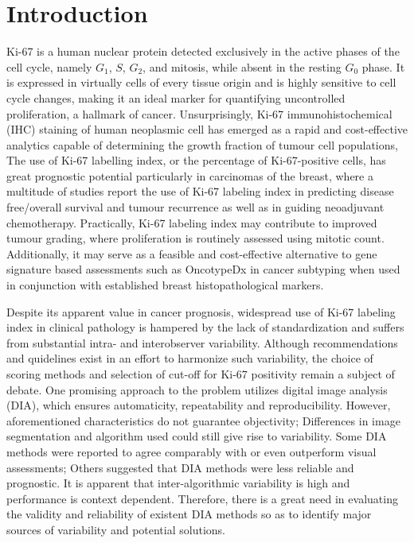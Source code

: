 \documentclass[final,5p,times,twocolumn]{elsarticle}
\begin{document}
\section*{Introduction}

Ki-67 is a human nuclear protein detected exclusively in the active phases of the cell cycle, namely $G_1$, $S$, $G_2$, and mitosis, while absent in the resting $G_0$ phase.\cite{Gerdes1984} It is expressed in virtually cells of every tissue origin and is highly sensitive to cell cycle changes, making it an ideal marker for quantifying uncontrolled proliferation, a hallmark of cancer. Unsurprisingly, Ki-67 immunohistochemical (IHC) staining of human neoplasmic cell has emerged as a rapid and cost-effective analytics capable of determining the growth fraction of tumour cell populations,  \cite{Scholzen2000} The use of Ki-67 labelling index, or the percentage of Ki-67-positive cells, has great prognostic potential particularly in carcinomas of the breast, where a multitude of studies report the use of Ki-67 labeling index in predicting disease free/overall survival and tumour recurrence \cite{Stuart-Harris2005, DeAzambuja2007, Petrelli2015} as well as in guiding neoadjuvant chemotherapy. \cite{Jones2009, Nishimura2010, Fasching2011} Practically, Ki-67 labeling index may contribute to improved tumour grading, where proliferation is routinely assessed using mitotic count. \cite{VanDiest2004} Additionally, it may serve as a feasible and cost-effective alternative to gene signature based assessments such as OncotypeDx in cancer subtyping when used in conjunction with established breast histopathological markers. \cite{Cuzick2011}

Despite its apparent value in cancer prognosis, widespread use of Ki-67 labeling index in clinical pathology is hampered by the lack of standardization and suffers from substantial intra- and interobserver variability. \cite{Dowsett2011a, Polley2013a} Although recommendations and quidelines exist in an effort to harmonize such variability, \cite{Polley2015} the choice of scoring methods and selection of cut-off for Ki-67 positivity remain a subject of debate. One promising approach to the problem utilizes digital image analysis (DIA), which ensures automaticity, repeatability and reproducibility. However, aforementioned characteristics do not guarantee objectivity; Differences in image segmentation and algorithm used could still give rise to variability. \cite{Tadrous2010} Some DIA methods were reported to agree comparably with \cite{Mohammed2012, Tang2012} or even outperform visual assessments; \cite{Laurinavicius2014, Stalhammar2016} Others suggested that DIA methods were less reliable and prognostic. \cite{Chabot-Richards2011} It is apparent that inter-algorithmic variability is high and performance is context dependent. Therefore, there is a great need in evaluating the validity and reliability of existent DIA methods so as to identify major sources of variability and potential solutions.
\end{document}
